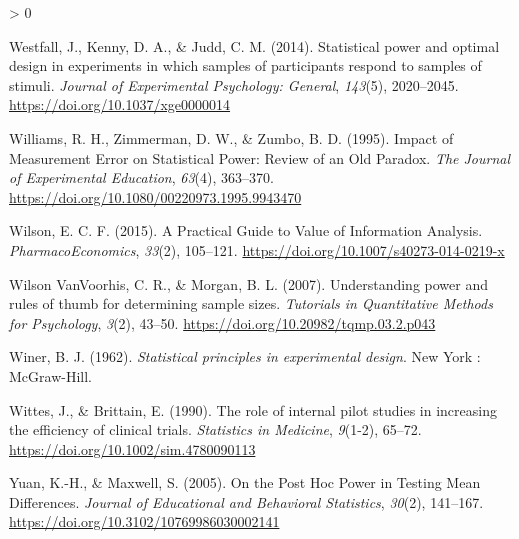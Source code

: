 \documentclass[
  english,
  ,jou, a4paper,floatsintext]{apa6}
\newlength{\cslhangindent}
\newenvironment{CSLReferences}[2] %
 {%
  \setlength{\parindent}{0pt}
  \ifodd #1 \everypar{\setlength{\hangindent}{\cslhangindent}}\ignorespaces\fi
  \ifnum #2 > 0
  \setlength{\parskip}{#2\baselineskip}
  \fi
 }%
 {}
\begin{document}
\begin{CSLReferences}{1}{0}
\leavevmode\hypertarget{ref-westfall_statistical_2014}{}%
Westfall, J., Kenny, D. A., \& Judd, C. M. (2014). Statistical power and optimal design in experiments in which samples of participants respond to samples of stimuli. \emph{Journal of Experimental Psychology: General}, \emph{143}(5), 2020--2045. \url{https://doi.org/10.1037/xge0000014}

\leavevmode\hypertarget{ref-williams_impact_1995}{}%
Williams, R. H., Zimmerman, D. W., \& Zumbo, B. D. (1995). Impact of {Measurement Error} on {Statistical Power}: Review of an {Old Paradox}. \emph{The Journal of Experimental Education}, \emph{63}(4), 363--370. \url{https://doi.org/10.1080/00220973.1995.9943470}

\leavevmode\hypertarget{ref-wilson_practical_2015}{}%
Wilson, E. C. F. (2015). A {Practical Guide} to {Value} of {Information Analysis}. \emph{PharmacoEconomics}, \emph{33}(2), 105--121. \url{https://doi.org/10.1007/s40273-014-0219-x}

\leavevmode\hypertarget{ref-wilson_vanvoorhis_understanding_2007}{}%
Wilson VanVoorhis, C. R., \& Morgan, B. L. (2007). Understanding power and rules of thumb for determining sample sizes. \emph{Tutorials in Quantitative Methods for Psychology}, \emph{3}(2), 43--50. \url{https://doi.org/10.20982/tqmp.03.2.p043}

\leavevmode\hypertarget{ref-winer_statistical_1962}{}%
Winer, B. J. (1962). \emph{Statistical principles in experimental design}. {New York : McGraw-Hill}.

\leavevmode\hypertarget{ref-wittes_role_1990}{}%
Wittes, J., \& Brittain, E. (1990). The role of internal pilot studies in increasing the efficiency of clinical trials. \emph{Statistics in Medicine}, \emph{9}(1-2), 65--72. \url{https://doi.org/10.1002/sim.4780090113}

\leavevmode\hypertarget{ref-yuan_post_2005}{}%
Yuan, K.-H., \& Maxwell, S. (2005). On the {Post Hoc Power} in {Testing Mean Differences}. \emph{Journal of Educational and Behavioral Statistics}, \emph{30}(2), 141--167. \url{https://doi.org/10.3102/10769986030002141}

\end{CSLReferences}

\endgroup
\end{document}
